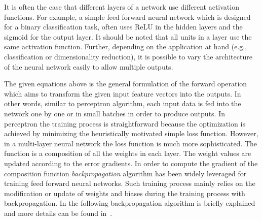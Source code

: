It is often the case that different layers of a network use different activation functions. For example, a simple feed forward neural network which is designed for a binary classification task, often uses ReLU in the hidden layers and the sigmoid for the output layer. It should be noted that all units in a layer use the same activation function. Further, depending on the application at hand (e.g., classification or dimensionality reduction), it is possible to vary the architecture of the neural network easily to allow multiple outputs.

The given equations above is the general formulation of the forward operation which aims to transform the given input feature vectors into the outputs. %
In other words, similar to perceptron algorithm, each input data is fed into the network one by one or in small batches in order to produce outputs. In perceptron the training process is straightforward because the
optimization is achieved by minimizing the heuristically motivated simple loss function. However, in a multi-layer neural network the loss function is much more sophisticated. The function is a composition of all the weights in each layer. The weight values are updated according to the error gradients. In order to compute the gradient of the composition function \textit{backpropagation} algorithm has been widely leveraged for training feed forward neural networks.
Such training process mainly relies on the modification or update of weights and biases during the training process with backpropagation. In the following backpropagation algorithm is briefly explained and more details can be found in~\cite{DBLP:series/utcs/Skansi18}. 

